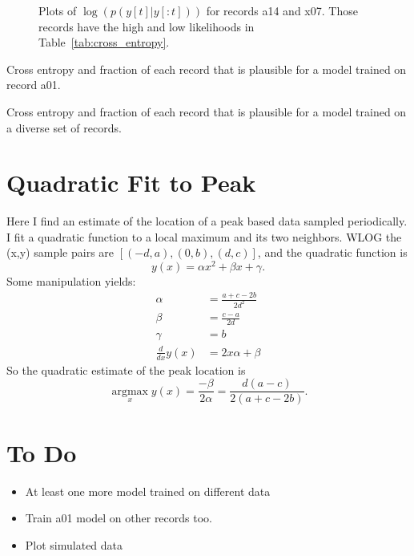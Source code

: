 \documentclass[12pt]{article}
\newcommand{\argmax}{\operatorname*{argmax}}
\begin{document}
\begin{figure}
  \centering
  \caption{Plots of $\log\left(p(y[t]|y[:t]) \right)$ for records a14
    and x07.  Those records have the high and low likelihoods in
    Table~\ref{tab:cross_entropy}.}
  \label{fig:likelihood}
\end{figure}

\begin{table}
  \centering
    
  \caption[Cross Entropy]{Cross entropy and fraction of each record
    that is plausible for a model trained on record a01.}
  \label{tab:cross_entropy}
\end{table}

\begin{table}
  \centering
    
  \caption[Cross Entropy]{Cross entropy and fraction of each record
    that is plausible for a model trained on a diverse set of records.}
  \label{tab:diverse_cross_entropy}
\end{table}

\section{Quadratic Fit to Peak}
\label{sec:quadratic}

Here I find an estimate of the location of a peak based data sampled
periodically.  I fit a quadratic function to a local maximum and its
two neighbors.  WLOG the (x,y) sample pairs are $[(-d,a), (0,b),
(d,c)]$, and the quadratic function is
\begin{equation*}
  y(x) = \alpha x^2 + \beta x + \gamma.
\end{equation*}
Some manipulation yields:
\begin{align*}
  \alpha &= \frac{a+c-2b}{2d^2} \\
  \beta &= \frac{c-a}{2d} \\
  \gamma &= b \\
  \frac{d}{dx} y(x) &= 2x\alpha + \beta
\end{align*}
So the quadratic estimate of the peak location is
\begin{equation*}
  \argmax_x y(x) = \frac{-\beta}{2\alpha} = \frac{d(a-c)}{2(a+c-2b)}.
\end{equation*}

\section{To Do}
\label{sec:todo}

\begin{itemize}
\item At least one more model trained on different data
\item Train a01 model on other records too.
\item Plot simulated data
\end{itemize}
\end{document}
